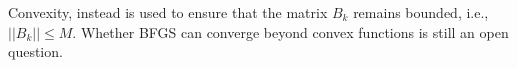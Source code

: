 \documentclass[10pt,a4paper]{article}
\begin{document}
\noindent Convexity, instead is used to ensure that the matrix $B_k$ remains bounded, i.e., $||B_k||\leq M$. Whether BFGS can converge beyond convex functions is still an open question. 
%
%
%





\end{document}
